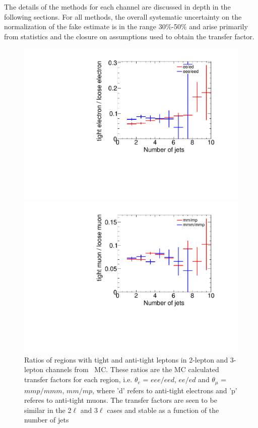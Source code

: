 The details of the methods for each channel are discussed in depth in the following sections. For all methods, the overall systematic uncertainty on the normalization of the fake estimate is in the range 30\%-50\% and arise primarily from statistics and the closure on assumptions used to obtain the transfer factor.

\begin{figure}[htbp]
\begin{minipage}[h]{0.5\textwidth}
    \centering \includegraphics[width=\textwidth]{figs/fake/compare_2e_3e_NJet_ratios}
\end{minipage}\hfill
\begin{minipage}[h]{0.5\textwidth}
    \centering \includegraphics[width=\textwidth]{figs/fake/compare_2m_3m_NJet_ratios}
\end{minipage}\hfill
\caption{Ratios of regions with tight and anti-tight leptons in 2-lepton and 3-lepton channels from \ttbar\ MC. These ratios are the MC calculated transfer factors for each region, i.e. $\theta_e$ = $eee/eed$, $ee/ed$ and $\theta_{\mu}$ =$mmp/mmm$, $mm/mp$, where 'd' refers to anti-tight electrons and 'p' referes to anti-tight muons. The transfer factors are seen to be similar in the 2$\ell$ and 3$\ell$ cases and stable as a function of the number of jets}
\label{figure:background_njetr}
\end{figure}

